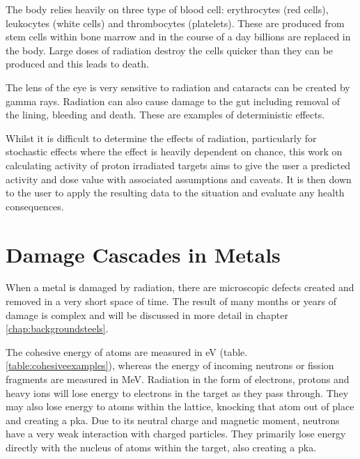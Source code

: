 The body relies heavily on three type of blood cell: erythrocytes (red cells), leukocytes (white cells) and thrombocytes (platelets).  These are produced from stem cells within bone marrow and in the course of a day billions are replaced in the body.  Large doses of radiation destroy the cells quicker than they can be produced and this leads to death.  

The lens of the eye is very sensitive to radiation and cataracts can be created by gamma rays.  Radiation can also cause damage to the gut including removal of the lining, bleeding and death.  These are examples of deterministic  effects.

Whilst it is difficult to determine the effects of radiation, particularly for stochastic effects where the effect is heavily dependent on chance, this work on calculating activity of proton irradiated targets aims to give the user a predicted activity and dose value with associated assumptions and caveats.  It is then down to the user to apply the resulting data to the situation and evaluate any health consequences.





\FloatBarrier

\section{Damage Cascades in Metals}

When a metal is damaged by radiation, there are microscopic defects created and removed in a very short space of time.  The result of many months or years of damage is complex and will be discussed in more detail in chapter \ref{chap:backgroundsteels}.

The cohesive energy of atoms are measured in eV (table. \ref{table:cohesiveexamples}), whereas the energy of incoming neutrons or fission fragments are measured in MeV.  Radiation in the form of electrons, protons and heavy ions will lose energy to electrons in the target as they pass through.  They may also lose energy to atoms within the lattice, knocking that atom out of place and creating a \acrshort{pka}.  Due to its neutral charge and magnetic moment, neutrons have a very weak interaction with charged particles.  They primarily lose energy directly with the nucleus of atoms within the target, also creating a \acrshort{pka}.

